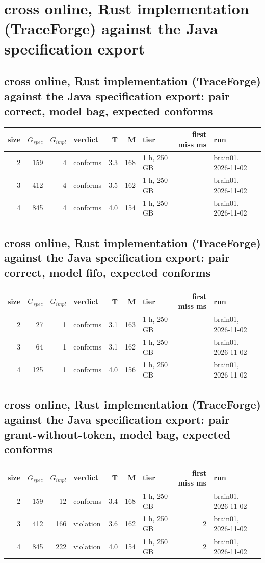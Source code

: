 \documentclass[10pt]{article}
\begin{document}
\section*{cross online, Rust implementation (TraceForge) against the Java specification export}
\subsection*{cross online, Rust implementation (TraceForge) against the Java specification export: pair \textsf{correct}, model bag, expected conforms}
\begin{longtable}{@{}rrrlrrlrl@{}}
\toprule
size & $G_{\mathit{spec}}$ & $G_{\mathit{impl}}$ & verdict & T & M & tier & first miss ms & run \\
\midrule
\endhead
\color{red} 2 & 159 & 4 & conforms & 3.3 & 168 & 1 h, 250 GB &  & brain01, 2026-11-02 \\
\color{red} 3 & 412 & 4 & conforms & 3.5 & 162 & 1 h, 250 GB &  & brain01, 2026-11-02 \\
\color{red} 4 & 845 & 4 & conforms & 4.0 & 154 & 1 h, 250 GB &  & brain01, 2026-11-02 \\
\bottomrule
\end{longtable}
\subsection*{cross online, Rust implementation (TraceForge) against the Java specification export: pair \textsf{correct}, model fifo, expected conforms}
\begin{longtable}{@{}rrrlrrlrl@{}}
\toprule
size & $G_{\mathit{spec}}$ & $G_{\mathit{impl}}$ & verdict & T & M & tier & first miss ms & run \\
\midrule
\endhead
\color{red} 2 & 27 & 1 & conforms & 3.1 & 163 & 1 h, 250 GB &  & brain01, 2026-11-02 \\
\color{red} 3 & 64 & 1 & conforms & 3.1 & 162 & 1 h, 250 GB &  & brain01, 2026-11-02 \\
\color{red} 4 & 125 & 1 & conforms & 4.0 & 156 & 1 h, 250 GB &  & brain01, 2026-11-02 \\
\bottomrule
\end{longtable}
\subsection*{cross online, Rust implementation (TraceForge) against the Java specification export: pair \textsf{grant-without-token}, model bag, expected conforms}
\begin{longtable}{@{}rrrlrrlrl@{}}
\toprule
size & $G_{\mathit{spec}}$ & $G_{\mathit{impl}}$ & verdict & T & M & tier & first miss ms & run \\
\midrule
\endhead
\color{red} 2 & 159 & 12 & conforms & 3.4 & 168 & 1 h, 250 GB &  & brain01, 2026-11-02 \\
\color{red} 3 & 412 & 166 & violation & 3.6 & 162 & 1 h, 250 GB & 2 & brain01, 2026-11-02 \\
\color{red} 4 & 845 & 222 & violation & 4.0 & 154 & 1 h, 250 GB & 2 & brain01, 2026-11-02 \\
\bottomrule
\end{longtable}
\end{document}
